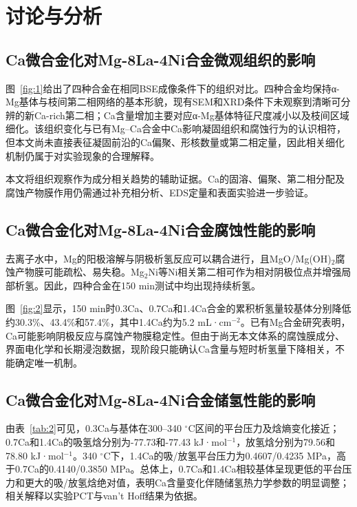 \documentclass[preprint,12pt]{elsarticle}
\begin{document}
\section{讨论与分析}

\subsection{Ca微合金化对Mg-8La-4Ni合金微观组织的影响}

图~\ref{fig:1}给出了四种合金在相同BSE成像条件下的组织对比。四种合金均保持α-Mg基体与枝间第二相网络的基本形貌，现有SEM和XRD条件下未观察到清晰可分辨的新Ca-rich第二相；Ca含量增加主要对应α-Mg基体特征尺度减小以及枝间区域细化。该组织变化与已有Mg--Ca合金中Ca影响凝固组织和腐蚀行为的认识相符\cite{ref6,ref7,ref12}，但本文尚未直接表征凝固前沿的Ca偏聚、形核数量或第二相定量，因此相关细化机制仍属于对实验现象的合理解释。

本文将组织观察作为成分相关趋势的辅助证据。Ca的固溶、偏聚、第二相分配及腐蚀产物膜作用仍需通过补充相分析、EDS定量和表面实验进一步验证。

\subsection{Ca微合金化对Mg-8La-4Ni合金腐蚀性能的影响}

去离子水中，Mg的阳极溶解与阴极析氢反应可以耦合进行，且MgO/Mg(OH)$_2$腐蚀产物膜可能疏松、易失稳\cite{ref9}。Mg$_2$Ni等Ni相关第二相可作为相对阴极位点并增强局部析氢\cite{ref10}。因此，四种合金在150 min测试中均出现持续析氢。

图~\ref{fig:2}显示，150 min时0.3Ca、0.7Ca和1.4Ca合金的累积析氢量较基体分别降低约30.3\%、43.4\%和57.4\%，其中1.4Ca约为5.2 mL·cm$^{-2}$。已有Mg合金研究表明，Ca可能影响阴极反应与腐蚀产物膜稳定性\cite{ref8,ref12}。但由于尚无本文体系的腐蚀膜成分、界面电化学和长期浸泡数据，现阶段只能确认Ca含量与短时析氢量下降相关，不能确定唯一机制。

\subsection{Ca微合金化对Mg-8La-4Ni合金储氢性能的影响}

由表~\ref{tab:2}可见，0.3Ca与基体在300–340 $^\circ$C区间的平台压力及焓熵变化接近；0.7Ca和1.4Ca的吸氢焓分别为-77.73和-77.43 kJ·mol$^{-1}$，放氢焓分别为79.56和78.80 kJ·mol$^{-1}$。340 $^\circ$C下，1.4Ca的吸/放氢平台压力为0.4607/0.4235 MPa，高于0.7Ca的0.4140/0.3850 MPa。总体上，0.7Ca和1.4Ca相较基体呈现更低的平台压力和更大的吸/放氢焓绝对值，表明Ca含量变化伴随储氢热力学参数的明显调整；相关解释以实验PCT与van’t Hoff结果为依据\cite{ref13}。
\end{document}
